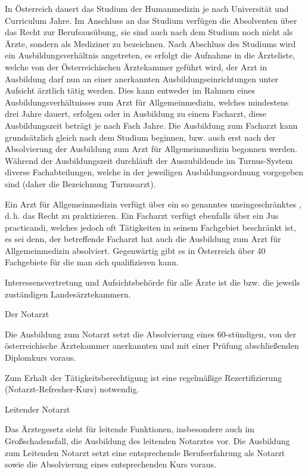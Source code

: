 \documentclass[
ngerman,
paper=a4,
asymmetric,
fontsize=10pt,
draft=false,
numbers=noenddot,
bibtotocnumbered,
footnotes=multiple,
]{scrreprt}
\newcommand{\jALTende}{\newline{\color{red}\rule{\linewidth}{2pt}\newline}}
\begin{document}
In Österreich dauert das Studium der Humanmedizin je nach
 Universität und Curriculum  Jahre. Im Anschluss an das
 Studium verfügen die Absolventen  über das Recht zur
 Berufsausübung, sie sind auch nach dem
 Studium noch nicht als Ärzte, sondern als Mediziner zu
bezeichnen. Nach Abschluss des Studiums wird ein
 Ausbildungsverhältnis angetreten, es erfolgt die Aufnahme in
die Ärzteliste, welche von der Österreichischen Ärztekammer
geführt wird, der Arzt in Ausbildung darf nun an einer
anerkannten Ausbildungseinrichtungen unter 
 Aufsicht ärztlich tätig werden. Dies kann entweder im Rahmen
 eines Ausbildungsverhältnisses zum Arzt für Allgemeinmedizin,
 welches mindestens drei Jahre dauert, erfolgen oder in Ausbildung zu
 einem Facharzt, diese Ausbildungszeit beträgt je nach Fach
  Jahre. Die Ausbildung zum Facharzt kann
 grundsätzlich gleich nach dem Studium beginnen, bzw. auch erst nach der
 Absolvierung der Ausbildung zum Arzt für Allgemeinmedizin
 begonnen werden. Während der Ausbildungszeit durchläuft der
 Auszubildende  im Turnus-System diverse
 Fachabteilungen, welche in der jeweiligen Ausbildungsordnung
vorgegeben sind (daher die Bezeichnung Turnusarzt). 
 
 Ein Arzt für Allgemeinmedizin verfügt über ein so genanntes
uneingeschränktes , d.\,h. das Recht zu
praktizieren. Ein Facharzt verfügt ebenfalls über ein Jus
practicandi, welches jedoch oft Tätigkeiten in seinem
 Fachgebiet beschränkt ist, es sei denn, der betreffende
 Facharzt hat auch die Ausbildung zum Arzt für
 Allgemeinmedizin absolviert. Gegenwärtig gibt es in
 Österreich über 40 Fachgebiete für die man sich
qualifizieren kann.
 
Interessensvertretung und Aufsichtsbehörde für alle Ärzte
ist die  bzw. die jeweils
zuständigen Landesärztekammern.
 
Der Notarzt
 
Die Ausbildung zum Notarzt setzt die Absolvierung eines 60-stündigen, von der
österreichische Ärztekammer anerkannten und mit einer
Prüfung abschließenden Diplomkurs
voraus.
 
 
Zum Erhalt der
Tätigkeitsberechtigung ist eine regelmäßige
Rezertifizierung (Notarzt-Refresher-Kurs) notwendig.
 
Leitender Notarzt
 
Das Ärztegesetz sieht für leitende Funktionen, insbesondere
auch im Großschadensfall, die Ausbildung des leitenden
Notarztes vor. Die Ausbildung zum Leitenden Notarzt setzt
eine entsprechende Berufserfahrung als Notarzt sowie die
Absolvierung eines entsprechenden Kurs voraus.
\jALTende
\end{document}
